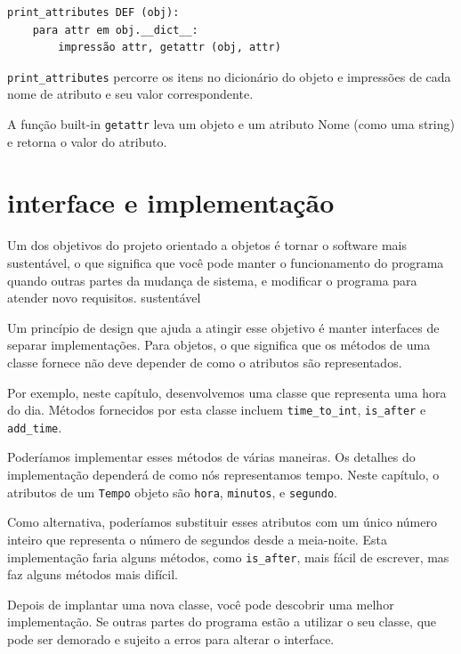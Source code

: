 \documentclass[10pt]{book}
\begin{document}
\begin{v erbatim}
\begin{verbatim}
print_attributes DEF (obj):
    para attr em obj.__dict__:
        impressão attr, getattr (obj, attr)
\end{verbatim}
%
\verb "print_attributes" percorre os itens no dicionário do objeto
e impressões de cada nome de atributo e seu valor correspondente.

A função built-in {\tt getattr} leva um objeto e um atributo
Nome (como uma string) e retorna o valor do atributo.


\section{interface e implementação}

Um dos objetivos do projeto orientado a objetos é tornar o software mais
sustentável, o que significa que você pode manter o funcionamento do programa quando
outras partes da mudança de sistema, e modificar o programa para atender novo
requisitos.
\index{} sustentável

Um princípio de design que ajuda a atingir esse objetivo é manter
interfaces de separar implementações. Para objetos, o que significa
que os métodos de uma classe fornece não deve depender de como o
atributos são representados.

Por exemplo, neste capítulo, desenvolvemos uma classe que representa
uma hora do dia. Métodos fornecidos por esta classe incluem
\Verb "time_to_int", \verb "is_after" e \verb "add_time".

Poderíamos implementar esses métodos de várias maneiras. Os detalhes do
implementação dependerá de como nós representamos tempo. Neste capítulo, o
atributos de um {\tt Tempo} objeto são {\tt hora}, {\tt minutos}, e
{\tt segundo}.

Como alternativa, poderíamos substituir esses atributos com
um único número inteiro que representa o número de segundos
desde a meia-noite. Esta implementação faria alguns métodos,
como \verb "is_after", mais fácil de escrever, mas faz alguns métodos
mais difícil.

Depois de implantar uma nova classe, você pode descobrir uma melhor
implementação. Se outras partes do programa estão a utilizar o seu
classe, que pode ser demorado e sujeito a erros para alterar o
interface.  


\end{v erbatim}
\end{document}
